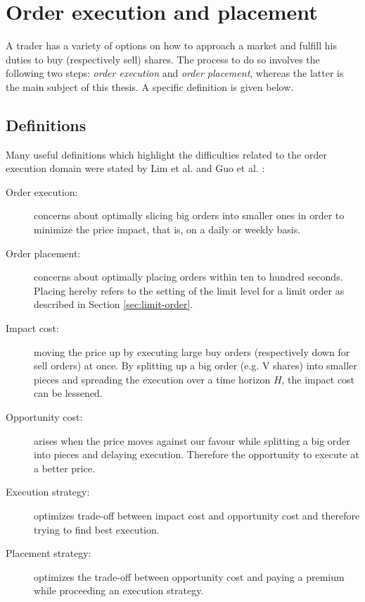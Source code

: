 \section{Order execution and placement}

A trader has a variety of options on how to approach a market and fulfill his duties to buy (respectively sell) shares.
The process to do so involves the following two steps: \textit{order execution} and \textit{order placement}, whereas the latter is the main subject of this thesis.
A specific definition is given below.

\subsection{Definitions}

Many useful definitions which highlight the difficulties related to the order execution domain were stated by Lim et al. \cite{lim2005optimal} and Guo et al. \cite{guo2013optimal}:
\begin{description}
    \item[Order execution:] concerns about optimally slicing big orders into smaller ones in order to minimize the price impact, that is, on a daily or weekly basis.
    \item[Order placement: ] concerns about optimally placing orders within ten to hundred seconds.
    Placing hereby refers to the setting of the limit level for a limit order as described in Section \ref{sec:limit-order}.
    \item[Impact cost:] moving the price up by executing large buy orders (respectively down for sell orders) at once. 
    By splitting up a big order (e.g. V shares) into smaller pieces and spreading the execution over a time horizon $H$, the impact cost can be lessened.
    \item[Opportunity cost:] arises when the price moves against our favour while splitting a big order into pieces and delaying execution. 
    Therefore the opportunity to execute at a better price.
    \item[Execution strategy:] optimizes trade-off between impact cost and opportunity cost and therefore trying to find best execution.
    
    \item[Placement strategy:] optimizes the trade-off between opportunity cost and paying a premium while proceeding an execution strategy.
    
\end{description}

